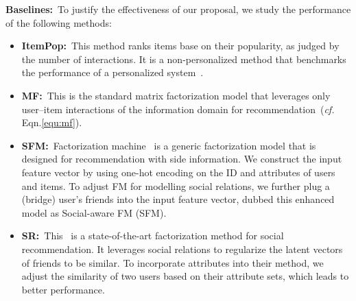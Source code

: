 \documentclass[sigconf]{acmart}
\newcommand{\cf}{\emph{cf. }}
\begin{document}
	\begin{table}[t]
		\centering
		\caption{Statistics of the complied datasets. The social user set includes the bridge users.}
		\vspace{-5pt}
		\label{tab:data-statistics}
		\vspace{-1em}
	\end{table}
	




	\textbf{Baselines:}~To justify the effectiveness of our proposal, we study the performance of the following methods:
	\begin{itemize}[leftmargin=*]
		\item\textbf{ItemPop:}~This method ranks items base on their popularity, as judged by the number of interactions. It is a non-personalized method that benchmarks the performance of a personalized system~\cite{DBLP:conf/uai/RendleFGS09}.
		\item\textbf{MF:}~This is the standard matrix factorization model that leverages only user--item interactions of the information domain for recommendation~(\cf Eqn.\eqref{equ:mf}).
		\item\textbf{SFM:}~Factorization machine~\cite{DBLP:conf/icdm/Rendle10} is a generic factorization model that is designed for recommendation with side information.
		We construct the input feature vector by using one-hot encoding on the ID and attributes of users and items.
		To adjust FM for modelling social relations, we further plug a (bridge) user's friends into the input feature vector, dubbed this enhanced model as Social-aware FM (SFM).
\item\textbf{SR:}~This~\cite{DBLP:conf/wsdm/MaZLLK11} is a state-of-the-art factorization method for social recommendation.
		It leverages social relations to regularize the latent vectors of friends to be similar.
		To incorporate attributes into their method, we adjust the similarity of two users based on their attribute sets, which leads to better performance.
\end{itemize}
	
\end{document}
